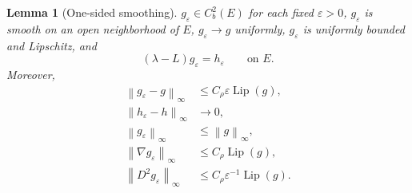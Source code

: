 \documentclass[aihp]{imsart}
\numberwithin{equation}{section}
\theoremstyle{plain}
\newtheorem{lemma}[lemma]{Lemma}
\theoremstyle{definition}
\newcommand{\Lip}{\operatorname{Lip}}
\newcommand{\1}{\mathbf 1}
\newcommand{\norm}[1]{\left\lVert #1\right\rVert}
\begin{document}
\begin{lemma}[One-sided smoothing]\label{lem:smoothing-basic}
$g_\varepsilon\in C_b^2(E)$ for each fixed $\varepsilon>0$, $g_\varepsilon$ is smooth on an open neighborhood of $E$, $g_\varepsilon\to g$ uniformly, $g_\varepsilon$ is uniformly bounded and Lipschitz, and
\begin{equation}\label{eq:smoothed-PDE}
 (\lambda-L)g_\varepsilon=h_\varepsilon
 \qquad\text{on }E.
\end{equation}
Moreover,
\begin{align}
 \norm{g_\varepsilon-g}_\infty&\le C_\rho\varepsilon\Lip(g),
 \label{eq:g-uniform-convergence}\\
 \norm{h_\varepsilon-h}_\infty&\longrightarrow0,
 \label{eq:h-uniform-convergence}\\
 \norm{g_\varepsilon}_\infty&\le\norm{g}_\infty,
 \label{eq:g-epsilon-bound}\\
 \norm{\nabla g_\varepsilon}_\infty&\le C_\rho\Lip(g),
 \label{eq:gradient-bound}\\
 \norm{D^2g_\varepsilon}_\infty&\le C_\rho\varepsilon^{-1}\Lip(g).
 \label{eq:hessian-bound}
\end{align}
\end{lemma}
\end{document}
